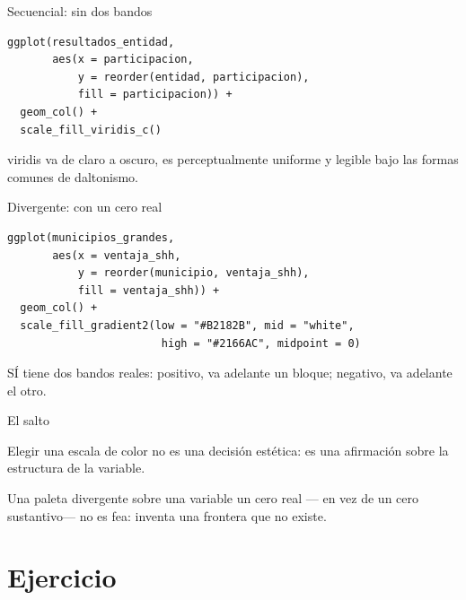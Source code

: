\begin{frame}[fragile]{Secuencial: sin dos bandos}
\begin{lstlisting}
ggplot(resultados_entidad,
       aes(x = participacion,
           y = reorder(entidad, participacion),
           fill = participacion)) +
  geom_col() +
  scale_fill_viridis_c()
\end{lstlisting}

  \vspace{0.5em}
  viridis va de claro a oscuro, es perceptualmente uniforme y legible
  bajo las formas comunes de daltonismo.
\end{frame}

\begin{frame}[fragile]{Divergente: con un cero real}
\begin{lstlisting}
ggplot(municipios_grandes,
       aes(x = ventaja_shh,
           y = reorder(municipio, ventaja_shh),
           fill = ventaja_shh)) +
  geom_col() +
  scale_fill_gradient2(low = "#B2182B", mid = "white",
                        high = "#2166AC", midpoint = 0)
\end{lstlisting}

  \vspace{0.4em}
  {\small{} SÍ tiene dos bandos reales: positivo, va
  adelante un bloque; negativo, va adelante el otro.}
\end{frame}

\begin{frame}{El salto}
  \vspace{0.4em}
  \begin{saltobox}
    Elegir una escala de color no es una decisión estética: es una
    afirmación sobre la estructura de la variable.

    \vspace{0.6em}
    Una paleta divergente sobre una variable  un cero real
    — en vez de un cero sustantivo— no es fea:
    inventa una frontera que no existe.
  \end{saltobox}
\end{frame}

\section{Ejercicio}

